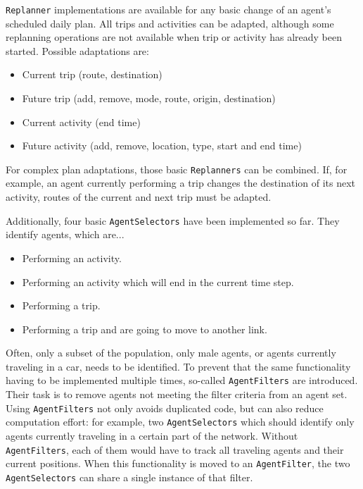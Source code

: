 \lstinline{Replanner} implementations are available for any basic change of an agent's scheduled daily plan. All trips and activities can be adapted, although some replanning operations are not available when trip or activity has already been started. Possible adaptations are:
\begin{itemize}\styleItemize
    \item Current trip (route, destination)
    \item Future trip (add, remove, mode, route, origin, destination)
    \item Current activity (end time)
    \item Future activity (add, remove, location, type, start and end time)
\end{itemize}
%
For complex plan adaptations, those basic \lstinline{Replanners} can be combined. If, for example, an agent currently performing a trip changes the destination of its next activity, routes of the current and next trip must be adapted.
%

Additionally, four basic \lstinline{AgentSelectors} have been implemented so far. They identify agents, which are...
\begin{itemize}\styleItemize
    \item Performing an activity.
    \item Performing an activity which will end in the current time step.
    \item Performing a trip.
    \item Performing a trip and are going to move to another link.
\end{itemize}
%

Often, only a subset of the population, \eg only male agents, or agents currently traveling in a car, needs to be identified. To prevent that the same functionality having to be implemented multiple times, so-called \lstinline{AgentFilters} are introduced. Their task is to remove agents not meeting the filter criteria from an agent set. Using \lstinline{AgentFilters} not only avoids duplicated code, but can also reduce computation effort: for example, two \lstinline{AgentSelectors} which should identify only agents currently traveling in a certain part of the network. Without \lstinline{AgentFilters}, each of them would have to track all traveling agents and their current positions. When this functionality is moved to an \lstinline{AgentFilter}, the two \lstinline{AgentSelectors} can share a single instance of that filter.
%

